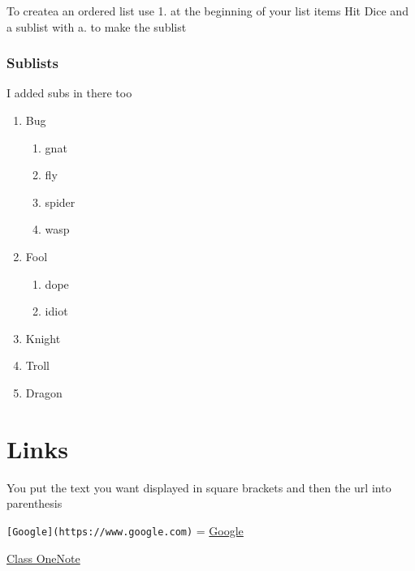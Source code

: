\documentclass[]{article}
\providecommand{\tightlist}{%
  \setlength{\itemsep}{0pt}\setlength{\parskip}{0pt}}
\begin{document}
To createa an ordered list use 1. at the beginning of your list items
Hit Dice and a sublist with a. to make the sublist

\hypertarget{sublists}{%
\subsubsection{Sublists}\label{sublists}}

I added subs in there too

\begin{enumerate}
\def\labelenumi{\arabic{enumi}.}
\tightlist
\item
  Bug

  \begin{enumerate}
  \def\labelenumii{\alph{enumii}.}
  \tightlist
  \item
    gnat
  \item
    fly
  \item
    spider
  \item
    wasp
  \end{enumerate}
\item
  Fool

  \begin{enumerate}
  \def\labelenumii{\roman{enumii}.}
  \tightlist
  \item
    dope
  \item
    idiot
  \end{enumerate}
\item
  Knight
\item
  Troll
\item
  Dragon
\end{enumerate}

\hypertarget{links}{%
\section{Links}\label{links}}

You put the text you want displayed in square brackets and then the url
into parenthesis

\texttt{{[}Google{]}(https://www.google.com)} =
\href{https://www.google.com}{Google}

\href{https://onedrive.live.com/edit.aspx/Documents/Combined\%20Notes?cid=7e1da892b45794cd\&id=documents\&wd=target\%28Technical\%2FTraining.one\%7CE6348C5D-083C-4A40-8324-D42F0B525693\%2FR\%20Markdown\%20Primer\%7C6ED37784-C83D-4E14-B84B-54A6BCD399EC\%2F\%29\%20onenote:https://d.docs.live.net/7e1da892b45794cd/Documents/Combined\%20Notes/Technical/Training.one\#R\%20Markdown\%20Primer\&section-id=\%7BE6348C5D-083C-4A40-8324-D42F0B525693\%7D\&page-id=\%7B6ED37784-C83D-4E14-B84B-54A6BCD399EC\%7D\&end}{Class
OneNote}
\end{document}
